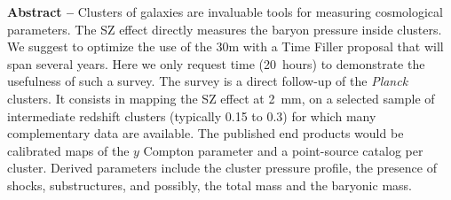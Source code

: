\documentclass[10pt,a4paper,twoside,graphicx,color]{article}
\begin{document}
\vspace{-0.3cm}
       {\bf Abstract -- } Clusters of galaxies are invaluable tools
       for measuring cosmological parameters. The SZ effect directly
       measures the baryon pressure inside clusters. We suggest to
       optimize the use of the 30m with a Time Filler proposal that
       will span several years. Here we only request time (20~hours)
       to demonstrate the usefulness of such a survey. The survey is a
       direct follow-up of the {\sl Planck} clusters. It consists in
       mapping the SZ effect at 2~mm, on a selected sample of
       intermediate redshift clusters (typically 0.15 to 0.3) for
       which many complementary data are available. The published end
       products would be calibrated maps of the $y$ Compton parameter
       and a point-source catalog per cluster. Derived parameters
       include the cluster pressure profile, the presence of shocks,
       substructures, and possibly, the total mass and the baryonic
       mass.\\

\end{document}
